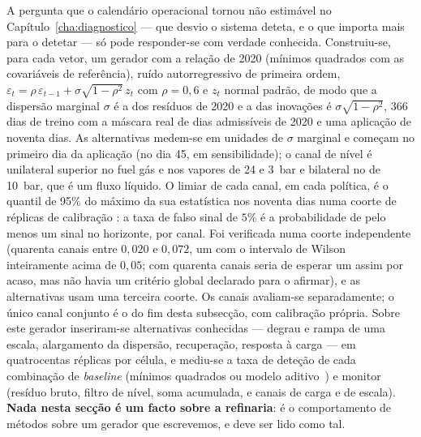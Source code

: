 A pergunta que o calendário operacional tornou não estimável no
Capítulo~\ref{cha:diagnostico} --- que desvio o sistema deteta, e o que
importa mais para o detetar --- só pode responder-se com verdade conhecida.
Construiu-se, para cada vetor, um gerador  com a relação de 2020 (mínimos quadrados com as
covariáveis de referência), ruído autorregressivo de primeira ordem, $\varepsilon_t = \rho\,\varepsilon_{t-1} + \sigma\sqrt{1-\rho^2}\,z_t$
com $\rho = 0{,}6$ e $z_t$ normal padrão, de modo que a dispersão marginal
$\sigma$ é a dos resíduos de 2020 e a das inovações é $\sigma\sqrt{1-\rho^2}$,
366 dias de treino com a máscara real de dias admissíveis de 2020 e uma
aplicação de noventa dias. As alternativas medem-se em unidades de $\sigma$
marginal e começam no primeiro dia da aplicação (no dia 45, em
sensibilidade); o canal de nível é unilateral superior no fuel gás e nos
vapores de 24 e 3~bar e bilateral no de 10~bar, que é um fluxo líquido. O
limiar de cada canal, em cada política, é o quantil de 95\% do máximo da
sua estatística nos noventa dias numa coorte de réplicas de calibração
: a
taxa de falso sinal de $5\%$ é a probabilidade de pelo menos um sinal no
horizonte, por canal. Foi verificada numa coorte independente (quarenta
canais entre $0{,}020$ e $0{,}072$, um com o intervalo de
Wilson~\cite{Wilson1927} inteiramente acima de $0{,}05$; com quarenta canais
seria de esperar um assim por acaso, mas não havia um critério global
declarado para o afirmar), e as alternativas usam uma terceira coorte. Os
canais avaliam-se separadamente; o único canal conjunto é o do fim desta
subsecção, com calibração própria. Sobre este gerador inseriram-se
alternativas conhecidas --- degrau e rampa de uma escala, alargamento da
dispersão, recuperação, resposta à carga --- em quatrocentas réplicas por
célula, e mediu-se a taxa de deteção de cada combinação de \emph{baseline}
(mínimos quadrados ou modelo aditivo~\cite{HastieTibshirani1986,Wood2017}) e
monitor (resíduo bruto, filtro de
nível, soma acumulada, e canais de carga e de escala). \textbf{Nada nesta
secção é um facto sobre a refinaria}: é o comportamento de métodos sobre um
gerador que escrevemos, e deve ser lido como tal.

